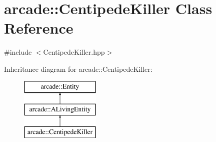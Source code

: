\hypertarget{classarcade_1_1_centipede_killer}{\section{arcade\-:\-:Centipede\-Killer Class Reference}
\label{classarcade_1_1_centipede_killer}
}


{\ttfamily \#include $<$Centipede\-Killer.\-hpp$>$}

Inheritance diagram for arcade\-:\-:Centipede\-Killer\-:\begin{figure}[H]
\begin{center}
\leavevmode
\includegraphics[height=3.000000cm]{classarcade_1_1_centipede_killer}
\end{center}
\end{figure}
